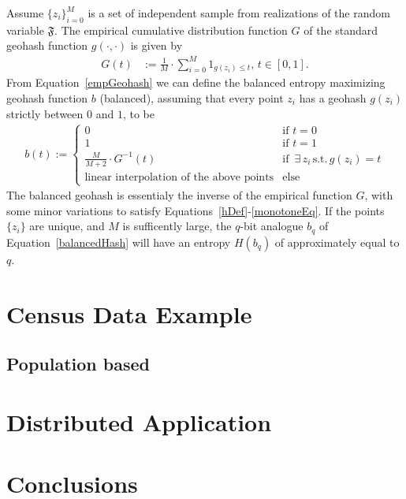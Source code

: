 \documentclass{article} %
\begin{document}
Assume $\{z_i\}_{i=0}^M$ is a set of independent sample from realizations of the random variable
$\mathfrak{F}$. The empirical cumulative distribution function $G$ of the standard geohash function
$g(\cdot, \cdot)$ is given by
\begin{align}
G(t) &:= \frac{1}{M} \cdot \sum_{i=0}^{M} 1_{g(z_i) \leq t}, \, t \in [0,1]. \label{empGeohash}
\end{align}
From Equation~\ref{empGeohash} we can define the balanced entropy maximizing geohash function
$b$ (balanced), assuming that every point $z_i$ has a geohash $g(z_i)$ strictly between $0$ and
$1$, to be
\begin{align}
b(t) :=
  \begin{cases}
    0 &\mbox{if } t = 0\\
    1 &\mbox{if } t = 1\\
    \frac{M}{M+2} \cdot G^{-1}(t) &\mbox{if } \, \exists \, z_i \, \text{s.t.} \, g(z_i) = t \\
    \text{linear interpolation of the above points} & \text{else}
  \end{cases} \label{balancedHash}
\end{align}
The balanced geohash is essentialy the inverse of the empirical function $G$, with some minor
variations to satisfy Equations~\ref{hDef}-\ref{monotoneEq}. If the points $\{z_i\}$ are unique,
and $M$ is sufficently large, the $q$-bit analogue $b_q$ of Equation~\ref{balancedHash} will
have an entropy $H(b_q)$ of approximately equal to $q$.

\section{Census Data Example}

\subsection{Population based}



\section{Distributed Application}


\section{Conclusions}
\end{document}
